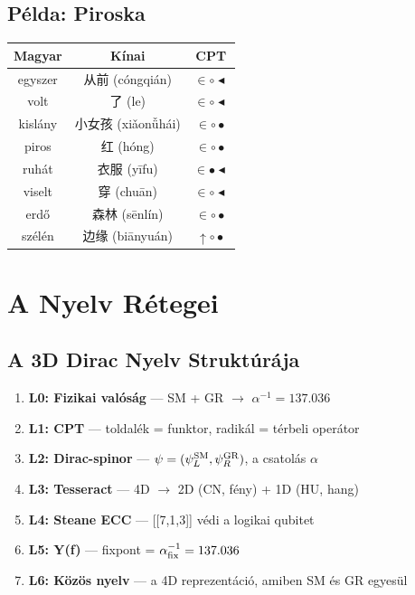\documentclass[11pt,a4paper,twoside]{book}
\begin{document}
\section{Példa: Piroska}

\begin{center}
\begin{tabular}{c|c|c}
\textbf{Magyar} & \textbf{Kínai} & \textbf{CPT} \\
\hline
egyszer & 从前 (cóngqián) & $\in\circ\blacktriangleleft$ \\
volt & 了 (le) & $\in\circ\blacktriangleleft$ \\
kislány & 小女孩 (xiǎonǚhái) & $\in\circ\bullet$ \\
piros & 红 (hóng) & $\in\circ\bullet$ \\
ruhát & 衣服 (yīfu) & $\in\bullet\blacktriangleleft$ \\
viselt & 穿 (chuān) & $\in\circ\blacktriangleleft$ \\
erdő & 森林 (sēnlín) & $\in\circ\bullet$ \\
szélén & 边缘 (biānyuán) & $\uparrow\circ\bullet$ \\
\end{tabular}
\end{center}

\chapter{A Nyelv Rétegei}

\section{A 3D Dirac Nyelv Struktúrája}

\begin{enumerate}
  \item \textbf{L0: Fizikai valóság} — SM + GR $\rightarrow$ $\alpha^{-1} = 137.036$
  \item \textbf{L1: CPT} — toldalék = funktor, radikál = térbeli operátor
  \item \textbf{L2: Dirac-spinor} — $\psi = (\psi_L^{\rm SM}, \psi_R^{\rm GR})$, a csatolás $\alpha$
  \item \textbf{L3: Tesseract} — 4D $\rightarrow$ 2D (CN, fény) + 1D (HU, hang)
  \item \textbf{L4: Steane ECC} — [[7,1,3]] védi a logikai qubitet
  \item \textbf{L5: Y(f)} — fixpont = $\alpha^{-1}_{\rm fix} = 137.036$
  \item \textbf{L6: Közös nyelv} — a 4D reprezentáció, amiben SM és GR egyesül
\end{enumerate}
\end{document}
